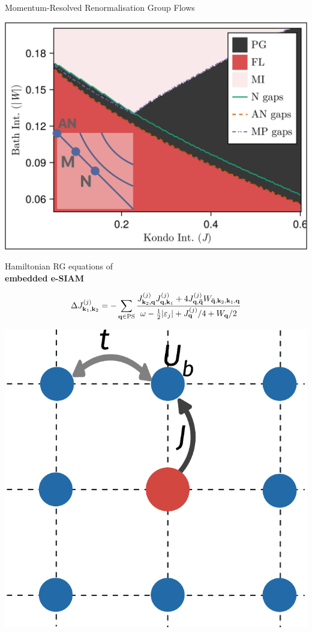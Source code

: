 \documentclass[11pt,aspectratio=169]{beamer}
\newcommand\focus[1]{%
	{\alert{\textbf{#1}}}
}
\begin{document}
\begin{frame}{Momentum-Resolved Renormalisation Group Flows}
\begin{minipage}{0.34\textwidth}
	\includegraphics[width=\textwidth]{phaseDiagram.pdf}
\end{minipage}
\hspace*{\fill}
\begin{minipage}{0.45\textwidth}
	Hamiltonian RG equations of \\
	\focus{embedded e-SIAM}
	\[\Delta J^{(j)}_{{\bf k}_1, {\bf k}_2} = -\sum_{{\bf q} \in \text{PS}} \frac{J^{(j)}_{{\bf k}_2,{\bf q}} J^{(j)}_{{\bf q},{\bf k}_1} + 4J^{(j)}_{{\bf q}, {\bf \bar q}} W_{{\bf \bar q}, {\bf k}_2, {\bf k}_1, {\bf q}}}{\omega - \frac{1}{2}|\varepsilon_j| + J^{(j)}_{{\bf q}}/4 + W_{{\bf q}}/2}\]
\end{minipage}
\hspace*{\fill}
\begin{minipage}{0.19\textwidth}
	\includegraphics[width=\textwidth]{pWaveEsiam.pdf}
\end{minipage}


\end{frame}
\end{document}
